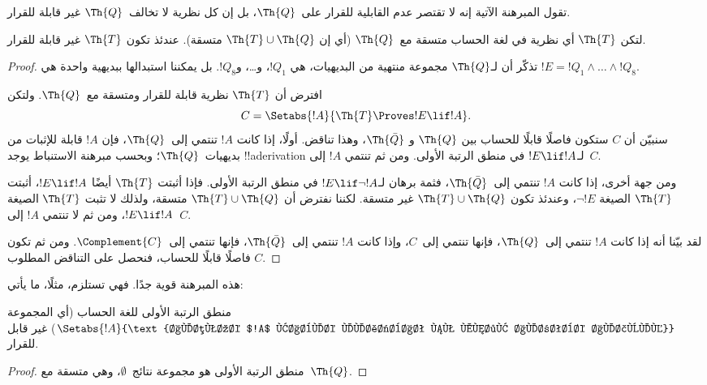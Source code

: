 \documentclass[../../../include/open-logic-section]{subfiles}
\begin{document}


تقول المبرهنة الآتية إنه لا تقتصر عدم القابلية للقرار على~$\Th{Q}$،
بل إن كل نظرية لا تخالف~$\Th{Q}$ غير قابلة للقرار.

\begin{thm}
لتكن $\Th{T}$ أي نظرية في لغة الحساب متسقة مع~$\Th{Q}$ (أي إن
$\Th{T}\cup\Th{Q}$ متسقة). عندئذ تكون $\Th{T}$ غير قابلة للقرار.
\end{thm}

\begin{proof}
تذكّر أن لـ$\Th{Q}$ مجموعة منتهية من البديهيات، هي $!Q_1$، و\dots،
و$!Q_8$. بل يمكننا استبدالها ببديهية واحدة هي
$!E=!Q_1\land\dots\land !Q_8$.

افترض أن $\Th{T}$ نظرية قابلة للقرار ومتسقة مع~$\Th{Q}$. ولتكن
\[
C=\Setabs{!A}{\Th{T}\Proves !E\lif !A}.
\]
سنبيّن أن $C$ ستكون فاصلًا قابلًا للحساب بين $\Th{Q}$ و
$\Th{\bar Q}$، وهذا تناقض. أولًا، إذا كانت $!A$ تنتمي إلى~$\Th{Q}$،
فإن $!A$ قابلة للإثبات من بديهيات~$\Th{Q}$؛ وبحسب مبرهنة الاستنباط يوجد
!!a{derivation} لـ$!E\lif !A$ في منطق الرتبة الأولى. ومن ثم تنتمي
$!A$ إلى~$C$.

ومن جهة أخرى، إذا كانت $!A$ تنتمي إلى~$\Th{\bar Q}$، فثمة برهان
لـ$!E\lif\lnot !A$ في منطق الرتبة الأولى. فإذا أثبتت $\Th{T}$ أيضًا
$!E\lif !A$، أثبتت $\Th{T}$ الصيغة $\lnot !E$، وعندئذ تكون
$\Th{T}\cup\Th{Q}$ غير متسقة. لكننا نفترض أن
$\Th{T}\cup\Th{Q}$ متسقة، ولذلك لا تثبت $\Th{T}$ الصيغة
$!E\lif !A$، ومن ثم لا تنتمي $!A$ إلى~$C$.

لقد بيّنا أنه إذا كانت $!A$ تنتمي إلى~$\Th{Q}$، فإنها تنتمي إلى~$C$،
وإذا كانت $!A$ تنتمي إلى~$\Th{\bar Q}$، فإنها تنتمي إلى~$\Complement{C}$.
ومن ثم تكون $C$ فاصلًا قابلًا للحساب، فنحصل على التناقض المطلوب.
\end{proof}

هذه المبرهنة قوية جدًا. فهي تستلزم، مثلًا، ما يأتي:

\begin{cor}
  منطق الرتبة الأولى للغة الحساب (أي المجموعة
  $\Setabs{!A}{\text{الصيغة $!A$ قابلة للإثبات في منطق الرتبة الأولى}}$)
  غير قابل للقرار.
\end{cor}

\begin{proof}
منطق الرتبة الأولى هو مجموعة نتائج~$\emptyset$، وهي متسقة مع~$\Th{Q}$.
\end{proof}
\end{document}
